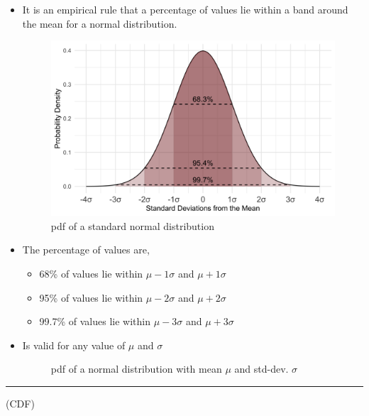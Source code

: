 \documentclass[	DIV=calc,%
paper=a4,%
fontsize=11pt,%
twocolumn]{scrartcl} %
\newcommand{\hformbar}[1]{\vspace{5pt}\hrule\vspace{10pt}} %
\newcommand{\formdesc}[1]{\noindent\textbf{#1}}
\begin{document}
\begin{itemize}
	\item It is an empirical rule that a percentage of values lie within a band around the mean for a normal distribution.
		
	\begin{figure}[ht!]
		\caption{pdf of a standard normal distribution}
		\graphicspath{ {images/math/} }
		\includegraphics[width=\linewidth]{standard_normal_distribution}
	\end{figure}
	\item The percentage of values are,
		\begin{itemize}
			\item 68\% of values lie within $\mu-1\sigma$ and $\mu+1\sigma$
			\item 95\% of values lie within $\mu-2\sigma$ and $\mu+2\sigma$
			\item 99.7\% of values lie within $\mu-3\sigma$ and $\mu+3\sigma$
		\end{itemize}
	
	\item Is valid for any value of $\mu$ and $\sigma$
	\begin{figure}[ht!]
		\caption{pdf of a normal distribution with mean $\mu$ and std-dev. $\sigma$}
		\graphicspath{ {images/math/} }
		
	\end{figure}
\end{itemize}

\newpage

\hformbar
\formdesc{Cumulative distribution function:} (CDF)
\end{document}
